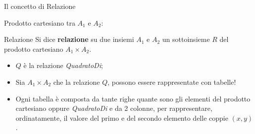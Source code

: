 \begin{frame}{Il concetto di Relazione}
\begin{minipage}[t]{0.4\linewidth}
Prodotto cartesiano tra $A_1$ e $A_2$:
\begin{center}
\cartesianproductRedQ
\end{center}
\end{minipage}%
\hfill%
\begin{minipage}[t]{0.6\linewidth}
\begin{block}{Relazione}
Si dice \textbf{relazione} su due insiemi $A_1$ e $A_2$ un sottoinsieme $R$ del prodotto cartesiano $A_1 \times A_2$.
\end{block}
\pause
\begin{itemize}[<+->]
    \item $Q$ \`e la relazione \textit{QuadratoDi};
    \item Sia $A_1 \times A_2$ che la relazione $Q$, possono essere rappresentate con tabelle!
    \item Ogni tabella \`e composta da tante righe quante sono gli elementi del prodotto cartesiano oppure \textit{QuadratoDi} e da 2 colonne, per rappresentare, ordinatamente, il valore del primo e del secondo elemento delle coppie $(x,y)$.
\end{itemize}
\end{minipage}
\end{frame}
%
